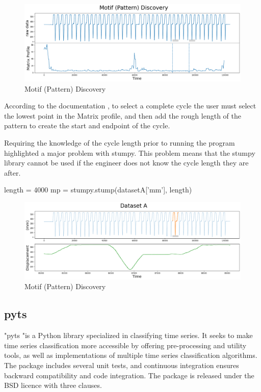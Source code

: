 \begin{figure}
\centering
\includegraphics[scale=0.40]{images/Motif (Pattern) Discovery.png}
\caption{Motif (Pattern) Discovery}
\label{Motif}
\end{figure}
According to the documentation \cite{law2019stumpy}, to select a complete cycle the user must select the lowest point in the Matrix profile, and then add the rough length of the pattern to create the start and endpoint of the cycle.

Requiring the knowledge of the cycle length prior to running the program highlighted a major problem with stumpy. This problem means that the stumpy library cannot be used if the engineer does not know the cycle length they are after. 
\begin{python}
length = 4000
mp = stumpy.stump(datasetA['mm'], length)

\end{python}

\begin{figure}
\centering
\includegraphics[scale=0.40]{images/DatasetA.png}
\caption{Motif (Pattern) Discovery}
\label{Stumpy Cycle selected}
\end{figure}

\subsection{pyts}
"pyts "is a Python library specialized in classifying time series. It seeks to make time series classification more accessible by offering pre-processing and utility tools, as well as implementations of multiple time series classification algorithms. The package includes several unit tests, and continuous integration ensures backward compatibility and code integration. The package is released under the BSD licence with three clauses.  \cite{JMLR:v21:19-763}


